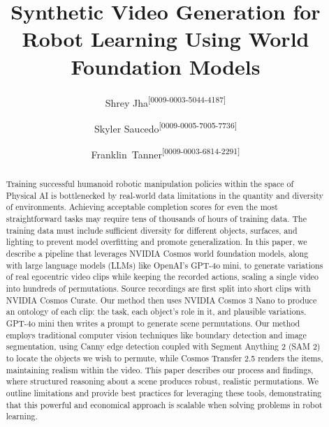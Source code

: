 \documentclass[runningheads]{llncs}
\def\orcidID#1{\unskip\textsuperscript{[#1]}}
\begin{document}
\title{Synthetic Video Generation for Robot Learning Using World Foundation Models}

\author{Shrey Jha\orcidID{0009-0003-5044-4187} \and
Skyler Saucedo\orcidID{0009-0005-7005-7736} \and
Franklin~Tanner\orcidID{0009-0003-6814-2291}}


\maketitle

\begin{abstract}
Training successful humanoid robotic manipulation policies within the space of Physical AI is bottlenecked by real-world data limitations in the quantity and diversity of environments. Achieving acceptable completion scores for even the most straightforward tasks may require tens of thousands of hours of training data. The training data must include sufficient diversity for different objects, surfaces, and lighting to prevent model overfitting and promote generalization. In this paper, we describe a pipeline that leverages NVIDIA Cosmos world foundation models, along with large language models (LLMs) like OpenAI's GPT-4o mini, to generate variations of real egocentric video clips while keeping the recorded actions, scaling a single video into hundreds of permutations. Source recordings are first split into short clips with NVIDIA Cosmos Curate. Our method then uses NVIDIA Cosmos 3 Nano to produce an ontology of each clip: the task, each object's role in it, and plausible variations. GPT-4o mini then writes a prompt to generate scene permutations. Our method employs traditional computer vision techniques like boundary detection and image segmentation, using Canny edge detection coupled with Segment Anything 2 (SAM 2) to locate the objects we wish to permute, while Cosmos Transfer 2.5 renders the items, maintaining realism within the video. This paper describes our process and findings, where structured reasoning about a scene produces robust, realistic permutations. We outline limitations and provide best practices for leveraging these tools, demonstrating that this powerful and economical approach is scalable when solving problems in robot learning.

\end{abstract}
\end{document}
